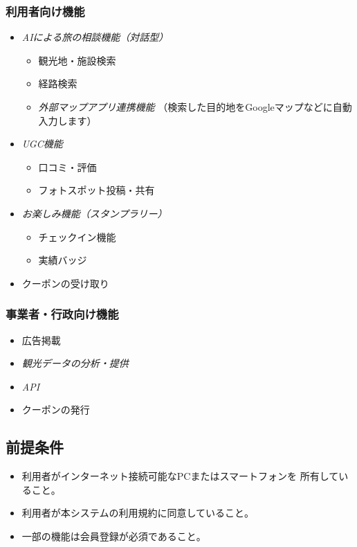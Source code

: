 \documentclass{docs}
\begin{document}
\subsubsection{利用者向け機能}
\begin{itemize}
	\item \emph{AIによる旅の相談機能（対話型）}
	\begin{itemize}
		\item 観光地・施設検索
		\item 経路検索
		\item \emph{外部マップアプリ連携機能}
		（検索した目的地をGoogleマップなどに自動入力します）
	\end{itemize}
	\item \emph{UGC機能}
	\begin{itemize}
		\item 口コミ・評価
		\item フォトスポット投稿・共有
	\end{itemize}
	\item \emph{お楽しみ機能（スタンプラリー）}
	\begin{itemize}
		\item チェックイン機能
		\item 実績バッジ
	\end{itemize}
	\item クーポンの受け取り
\end{itemize}

\subsubsection{事業者・行政向け機能}
\begin{itemize}
	\item 広告掲載
	\item \emph{観光データの分析・提供}
	\item \emph{API}
	\item クーポンの発行
\end{itemize}

\subsection{前提条件}
\begin{itemize}
	\item 利用者がインターネット接続可能なPCまたはスマートフォンを
	所有していること。
	\item 利用者が本システムの利用規約に同意していること。
	\item 一部の機能は会員登録が必須であること。
\end{itemize}
\end{document}
